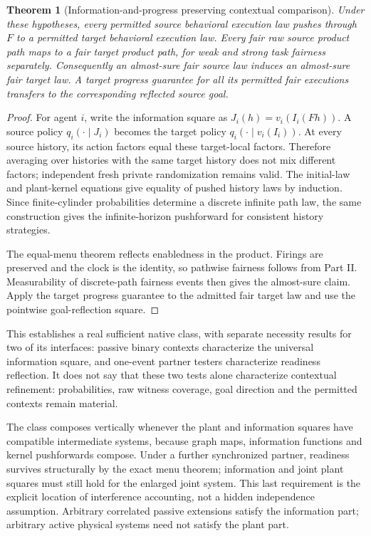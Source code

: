 \documentclass[11pt]{article}
\newtheorem{theorem}{Theorem}\newtheorem{proposition}{Proposition}
\begin{document}
\begin{theorem}[Information-and-progress preserving contextual comparison]
Under these hypotheses, every permitted source behavioral execution law pushes through $F$ to a permitted target behavioral execution law. Every fair raw source product path maps to a fair target product path, for weak and strong task fairness separately. Consequently an almost-sure fair source law induces an almost-sure fair target law. A target progress guarantee for all its permitted fair executions transfers to the corresponding reflected source goal.
\end{theorem}
\begin{proof}
For agent $i$, write the information square as $J_i(h)=v_i(I_i(Fh))$. A source policy $q_i(\cdot\mid J_i)$ becomes the target policy $q_i(\cdot\mid v_i(I_i))$. At every source history, its action factors equal these target-local factors. Therefore averaging over histories with the same target history does not mix different factors; independent fresh private randomization remains valid. The initial-law and plant-kernel equations give equality of pushed history laws by induction. Since finite-cylinder probabilities determine a discrete infinite path law, the same construction gives the infinite-horizon pushforward for consistent history strategies.

The equal-menu theorem reflects enabledness in the product. Firings are preserved and the clock is the identity, so pathwise fairness follows from Part II. Measurability of discrete-path fairness events then gives the almost-sure claim. Apply the target progress guarantee to the admitted fair target law and use the pointwise goal-reflection square.
\end{proof}

This establishes a real sufficient native class, with separate necessity results for two of its interfaces: passive binary contexts characterize the universal information square, and one-event partner testers characterize readiness reflection. It does not say that these two tests alone characterize contextual refinement: probabilities, raw witness coverage, goal direction and the permitted contexts remain material.

The class composes vertically whenever the plant and information squares have compatible intermediate systems, because graph maps, information functions and kernel pushforwards compose. Under a further synchronized partner, readiness survives structurally by the exact menu theorem; information and joint plant squares must still hold for the enlarged joint system. This last requirement is the explicit location of interference accounting, not a hidden independence assumption. Arbitrary correlated passive extensions satisfy the information part; arbitrary active physical systems need not satisfy the plant part.
\end{document}
